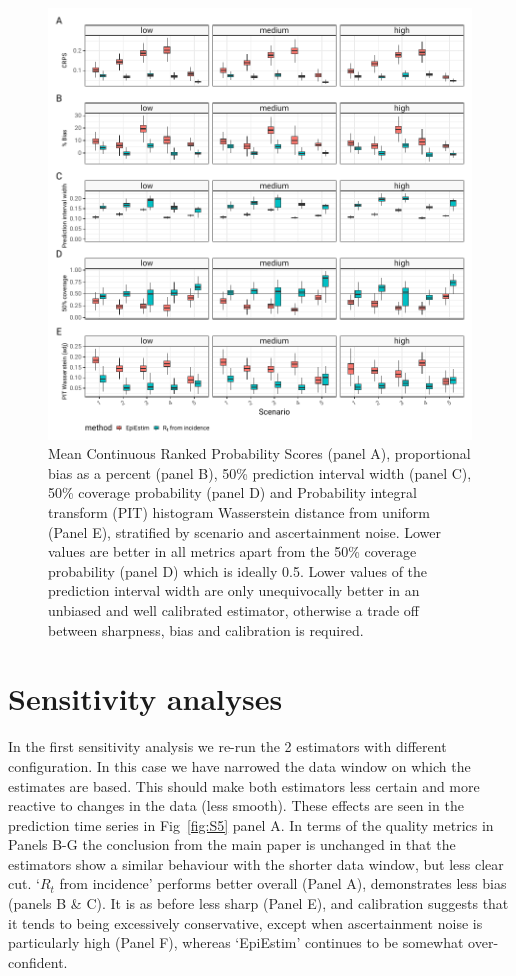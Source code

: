 \documentclass[a4paper, 12pt, twoside]{article}
\let\Oldsection\section
\renewcommand{\section}{\FloatBarrier\Oldsection}
\begin{document}
\begin{figure}[h!]
\centering
  \includegraphics{fig/fig4-metrics-by-scenario}
  \caption{Mean Continuous Ranked Probability Scores (panel A), proportional bias as a percent (panel B), 50\% prediction interval width (panel C), 50\% coverage probability (panel D) and Probability integral transform (PIT) histogram Wasserstein distance from uniform (Panel E), stratified by scenario and ascertainment noise. Lower values are better in all metrics apart from the 50\% coverage probability (panel D) which is ideally 0.5. Lower values of the prediction interval width are only unequivocally better in an unbiased and well calibrated estimator, otherwise a trade off between sharpness, bias and calibration is required.}
\label{fig:S4}
\end{figure}

\clearpage

\section{Sensitivity analyses}

In the first sensitivity analysis we re-run the 2 estimators with different configuration. In this case we have narrowed the data window on which the estimates are based. This should make both estimators less certain and more reactive to changes in the data (less smooth). These effects are seen in the prediction time series in Fig~\ref{fig:S5} panel A. In terms of the quality metrics in Panels B-G the conclusion from the main paper is unchanged in that the estimators show a similar behaviour with the shorter data window, but less clear cut. `$R_t$ from incidence' performs better overall (Panel A), demonstrates less bias (panels B \& C). It is as before less sharp (Panel E), and calibration suggests that it tends to being excessively conservative, except when ascertainment noise is particularly high (Panel F), whereas `EpiEstim' continues to be somewhat over-confident.
\end{document}
